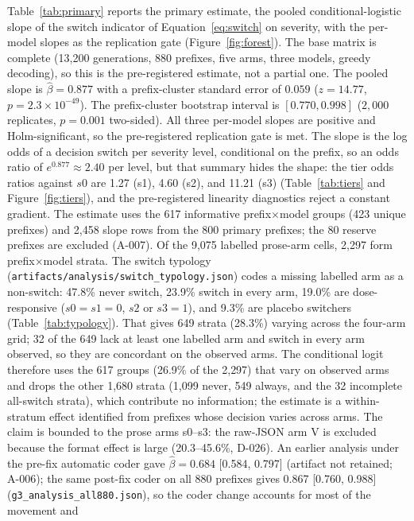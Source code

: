 \documentclass[a4paper,fleqn]{cas-sc}
\begin{document}
Table~\ref{tab:primary} reports the primary estimate, the pooled conditional-logistic slope of the switch indicator of
Equation~\ref{eq:switch} on severity, with the per-model slopes as the replication gate
(Figure~\ref{fig:forest}). The
base matrix is complete (13{,}200 generations, 880 prefixes, five arms, three models, greedy
decoding), so this is the pre-registered estimate, not a partial one. The pooled slope is $\hat\beta = 0.877$ with a prefix-cluster standard error of $0.059$
($z = 14.77$, $p = 2.3\times10^{-49}$). The prefix-cluster bootstrap interval is
$[0.770, 0.998]$ ($2{,}000$ replicates, $p = 0.001$ two-sided). All three per-model slopes
are positive and Holm-significant, so the pre-registered replication gate is met. The slope is
the log odds of a decision switch per severity level, conditional on the prefix, so an odds
ratio of $e^{0.877} \approx 2.40$ per level, but that summary hides the shape: the tier odds
ratios against $s0$ are 1.27 (s1), 4.60 (s2), and 11.21 (s3) (Table~\ref{tab:tiers} and
Figure~\ref{fig:tiers}), and the pre-registered linearity diagnostics reject a constant gradient. The estimate uses the 617 informative prefix$\times$model groups
(423 unique prefixes) and 2{,}458 slope rows from the 800 primary
prefixes; the 80 reserve prefixes are excluded (A-007). Of the 9{,}075 labelled prose-arm
cells, 2{,}297 form prefix$\times$model strata. The switch typology
(\texttt{artifacts/analysis/switch\_typology.json}) codes a missing labelled arm
as a non-switch: 47.8\% never switch, 23.9\% switch in every arm, 19.0\% are dose-responsive
($s0=s1=0$, $s2$ or $s3=1$), and 9.3\% are placebo switchers (Table~\ref{tab:typology}). That
gives 649 strata (28.3\%) varying across the four-arm grid; 32 of the 649 lack at least one
labelled arm and switch in every arm observed, so they are concordant on the observed arms. The
conditional logit therefore uses the 617 groups (26.9\% of the 2{,}297) that vary on observed
arms and drops the other 1{,}680 strata (1{,}099 never, 549 always, and the 32 incomplete
all-switch strata), which contribute no information; the estimate is a
within-stratum effect identified from prefixes whose decision varies across arms.
The claim is bounded to the prose
arms s0--s3: the raw-JSON arm V is excluded because the format effect is large (20.3--45.6\%,
D-026). An earlier analysis under the pre-fix automatic coder gave $\hat\beta = 0.684$
[0.584, 0.797] (artifact not retained; A-006); the same post-fix coder on all 880 prefixes gives 0.867 [0.760, 0.988]
(\texttt{g3\_analysis\_all880.json}), so the coder change accounts for most of the movement and
\end{document}
